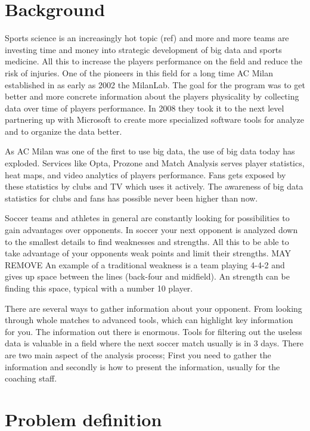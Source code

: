 \section{Background}

Sports science is an increasingly hot topic (ref) and more and more teams are investing time and money into strategic development of big data and sports medicine. All this to increase the players performance on the field and reduce the risk of injuries. One of the pioneers in this field for a long time AC Milan established in as early as 2002 the MilanLab. The goal for the program was to get better and more concrete information about the players physicality by collecting data over time of players performance. In 2008 they took it to the next level partnering up with Microsoft to create more specialized software tools  for analyze and to organize the data better.

As AC Milan was one of the first to use big data, the use of big data today has exploded. Services like Opta, Prozone and Match Analysis serves player statistics, heat maps, and video analytics of players performance. Fans gets exposed by these statistics by clubs and TV which uses it actively. The awareness of big data statistics for clubs and fans has possible never been higher than now.

Soccer teams and athletes in general are constantly looking for possibilities to gain advantages over opponents. In soccer your next opponent is analyzed down to the smallest details to find weaknesses and strengths. All this to be able to take advantage of your opponents weak points and limit their strengths. MAY REMOVE An example of a traditional weakness is a team playing 4-4-2 and gives up space between the lines (back-four and midfield). An strength can be finding this space, typical with a number 10 player.

There are several ways to gather information about your opponent. From looking through whole matches to advanced tools, which can highlight key information for you. The information out there is enormous. Tools for filtering out the useless data is valuable in a field where the next soccer match usually is in 3 days. There are two main aspect of the analysis process; First you need to gather the information and secondly is how to present the information, usually for the coaching staff.

\section{Problem definition}

